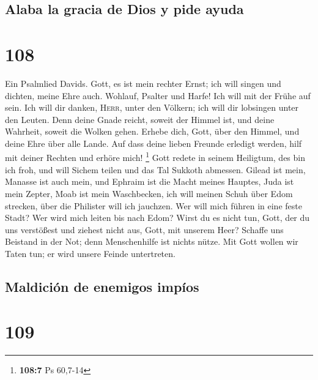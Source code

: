 \hypertarget{alaba-la-gracia-de-dios-y-pide-ayuda}{%
\subsection{Alaba la gracia de Dios y pide
ayuda}\label{alaba-la-gracia-de-dios-y-pide-ayuda}}

\hypertarget{section-107}{%
\section{108}\label{section-107}}

 Ein Psalmlied Davids.  Gott, es ist mein
rechter Ernst; ich will singen und dichten, meine Ehre auch.
 Wohlauf, Psalter und Harfe! Ich will mit der Frühe auf
sein.  Ich will dir danken, \textsc{Herr}, unter den
Völkern; ich will dir lobsingen unter den Leuten.  Denn
deine Gnade reicht, soweit der Himmel ist, und deine Wahrheit, soweit
die Wolken gehen.  Erhebe dich, Gott, über den Himmel, und
deine Ehre über alle Lande.  Auf dass deine lieben Freunde
erledigt werden, hilf mit deiner Rechten und erhöre mich! \footnote{\textbf{108:7}
  Ps 60,7-14}  Gott redete in seinem Heiligtum, des bin
ich froh, und will Sichem teilen und das Tal Sukkoth abmessen.
 Gilead ist mein, Manasse ist auch mein, und Ephraim ist
die Macht meines Hauptes, Juda ist mein Zepter,  Moab ist
mein Waschbecken, ich will meinen Schuh über Edom strecken, über die
Philister will ich jauchzen.  Wer will mich führen in
eine feste Stadt? Wer wird mich leiten bis nach Edom? 
Wirst du es nicht tun, Gott, der du uns verstößest und ziehest nicht
aus, Gott, mit unserem Heer?  Schaffe uns Beistand in der
Not; denn Menschenhilfe ist nichts nütze.  Mit Gott
wollen wir Taten tun; er wird unsere Feinde untertreten.

\hypertarget{maldiciuxf3n-de-enemigos-impuxedos}{%
\subsection{Maldición de enemigos
impíos}\label{maldiciuxf3n-de-enemigos-impuxedos}}

\hypertarget{section-108}{%
\section{109}\label{section-108}}

